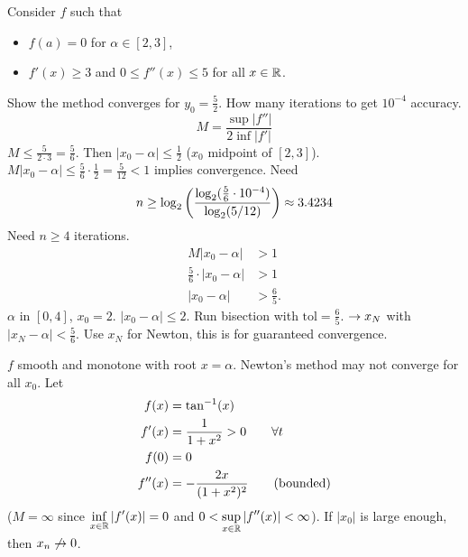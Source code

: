 \documentclass[]{article}
\begin{document}
\begin{example}
	Consider $f$ such that
	\begin{itemize}
		\item $f(a)=0$ for $\alpha\in[2,3]$,
		\item $f'(x)\geq3$ and $0\leq f''(x)\leq5$ for all $x\in\mathbb{R}$.
	\end{itemize}
	Show the method converges for $y_0=\frac52$.
	How many iterations to get $10^{-4}$ accuracy.
	$$ M = \frac{\sup|f''|}{2\inf|f'|} $$
	$ M \leq \frac 5{2\cdot3} = \frac56$.
	Then $|x_0-\alpha| \leq \frac12$ ($x_0$ midpoint of $[2,3]$).
	$M|x_0-\alpha| \leq \frac56\cdot\frac12 = \frac5{12}<1$ implies convergence.
	Need $$ n\geq\log_2\left(\frac{\log_2(\frac56\cdot10^{-4})}{\log_2(5/12)}\right) \approx 3.4234 $$
	Need $n\geq4$ iterations.
	\begin{align*}
		M|x_0-\alpha| &> 1 \\
		\frac56\cdot|x_0-\alpha| &> 1 \\
		|x_0-\alpha| &> \frac65.
	\end{align*}
	$\alpha$ in $[0,4]$, $x_0=2$. $|x_0-\alpha|\leq2$.
	Run bisection with $\text{tol}=\frac65$. $\rightarrow x_N$ with $|x_N-\alpha|<\frac56$. Use $x_N$ for Newton, this is for guaranteed convergence.
\end{example}
\begin{example}
	$f$ smooth and monotone with root $x=\alpha$. Newton's method may not converge for all $x_0$.
	Let 
	\begin{align*}
		f(x) &=\tan^{-1}(x) \\
		f'(x) &= \frac1{1+x^2}>0 \qquad \forall t \\
		f(0) &=0 \\
		f''(x) &= -\frac{2x}{(1+x^2)^2} \qquad \text{(bounded)}
	\end{align*}
	($M=\infty$ since $\displaystyle\inf_{x\in\mathbb{R}}|f'(x)|=0$ and $\displaystyle0<\sup_{x\in\mathbb{R}}|f''(x)|<\infty$).
	If $|x_0|$ is large enough, then $x_n\not\rightarrow0$.
\end{example}
\end{document}
